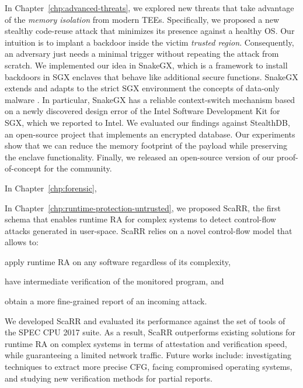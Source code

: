 In Chapter~\ref{chp:advanced-threats}, we explored new threats that take 
advantage of the \emph{memory isolation} from modern TEEs.
Specifically, we proposed a new stealthy code-reuse attack that minimizes 
its presence against a healthy OS.
Our intuition is to implant a backdoor inside the victim \emph{trusted region}.
Consequently, an adversary just needs a minimal trigger without repeating the 
attack from scratch.
We implemented our idea in SnakeGX, which is a framework to install 
backdoors in SGX enclaves that behave like additional secure functions.
SnakeGX extends and adapts to the strict SGX environment the concepts of 
data-only malware \citep{vogl2014persistent}.
In particular, SnakeGX has a reliable context-switch mechanism based 
on a newly discovered design error of the Intel Software Development Kit 
for SGX, which we reported to Intel.
We evaluated our findings against StealthDB, an open-source project that 
implements an encrypted database.
Our experiments show that we can reduce the memory footprint of the payload
while preserving the enclave functionality.
Finally, we released an open-source version of our proof-of-concept for the 
community.

In Chapter~\ref{chp:forensic}, \todo{\dots}

In Chapter~\ref{chp:runtime-protection-untrusted}, we proposed ScaRR, the first 
schema that enables runtime RA for complex systems to detect control-flow 
attacks generated in user-space.
ScaRR relies on a novel control-flow model that allows to:
\begin{enumerate*}[label=(\roman*)]
	\item apply runtime RA on any software regardless of its complexity,
	\item have intermediate verification of the monitored program, and
	\item obtain a more fine-grained report of an incoming attack.
\end{enumerate*}
We developed ScaRR and evaluated its performance against the set of tools of 
the SPEC CPU 2017 suite.
As a result, ScaRR outperforms existing solutions for runtime RA on complex 
systems in terms of attestation and verification speed, while guaranteeing a 
limited network traffic.
Future works include: investigating techniques to extract more precise CFG, 
facing compromised operating systems, and studying new verification methods for 
partial reports.

